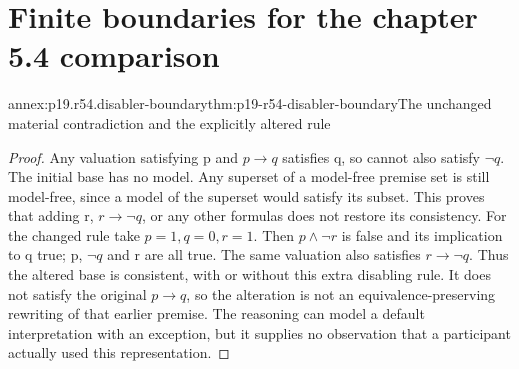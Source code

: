 \section{Finite boundaries for the chapter 5.4 comparison}

\begin{annexitem}{annex:p19.r54.disabler-boundary}{thm:p19-r54-disabler-boundary}{The unchanged material contradiction and the explicitly altered rule}
\begin{proof}
Any valuation satisfying p and \(p\to q\) satisfies q,
so cannot also satisfy \(\neg q\). The initial base has
no model. Any superset of a model-free premise set is still
model-free, since a model of the superset would satisfy its
subset. This proves that adding r, \(r\to\neg q\), or
any other formulas does not restore its consistency.
For the changed rule take \(p=1,q=0,r=1\). Then
\(p\land\neg r\) is false and its implication to q true;
p, \(\neg q\) and r are all true. The same valuation also
satisfies \(r\to\neg q\). Thus the altered base is
consistent, with or without this extra disabling rule.
It does not satisfy the original \(p\to q\), so the
alteration is not an equivalence-preserving rewriting of
that earlier premise. The reasoning can model a default
interpretation with an exception, but it supplies no observation
that a participant actually used this representation.
\end{proof}
\end{annexitem}

